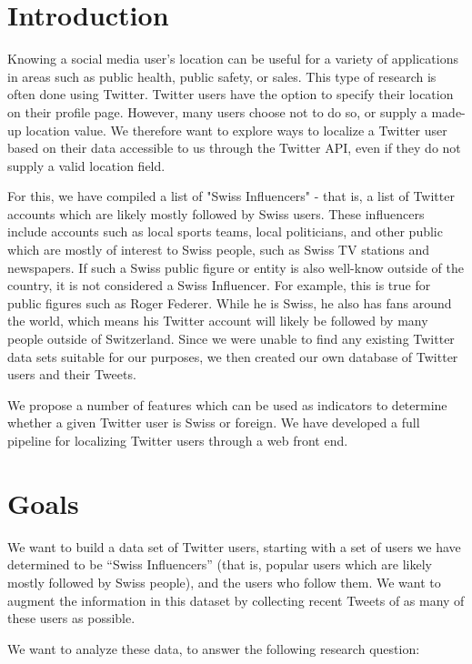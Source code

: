 \documentclass[10pt,a4paper]{article}
\begin{document}
\clearpage
\tableofcontents
\clearpage

\section{Introduction}
Knowing a social media user's location can be useful for a variety of applications in areas such as public health, public safety, or sales. This type of research is often done using Twitter. Twitter users have the option to specify their location on their profile page. However, many users choose not to do so, or supply a made-up location value. We therefore want to explore ways to localize a Twitter user based on their data accessible to us through the Twitter API, even if they do not supply a valid location field.

For this, we have compiled a list of "Swiss Influencers" - that is, a list of Twitter accounts which are likely mostly followed by Swiss users. These influencers include accounts such as local sports teams, local politicians, and other public which are mostly of interest to Swiss people, such as Swiss TV stations and newspapers. If such a Swiss public figure or entity is also well-know outside of the country, it is not considered a Swiss Influencer. For example, this is true for public figures such as Roger Federer. While he is Swiss, he also has fans around the world, which means his Twitter account will likely be followed by many people outside of Switzerland. Since we were unable to find any existing Twitter data sets suitable for our purposes, we then created our own database of Twitter users and their Tweets.

We propose a number of features which can be used as indicators to determine whether a given Twitter user is Swiss or foreign. We have developed a full pipeline for localizing Twitter users through a web front end.

\section{Goals}
We want to build a data set of Twitter users, starting with a set of users we have determined to be “Swiss Influencers” (that is, popular users which are likely mostly followed by Swiss people), and the users who follow them. We want to augment the information in this dataset by collecting recent Tweets of as many of these users as possible.

We want to analyze these data, to answer the following research question:
\end{document}
